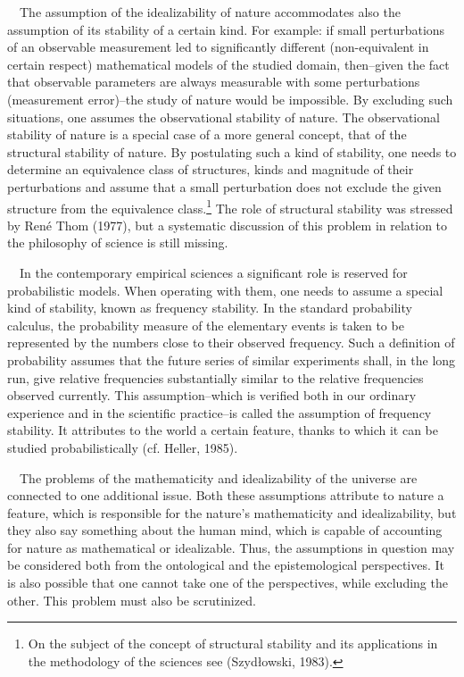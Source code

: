 \documentclass[a4paper]{article}
\begin{document}
\ \ The assumption of  the idealizability of nature accommodates also the assumption of its stability of a certain kind.
For example: if small perturbations of an observable measurement led to significantly different (non-equivalent in
certain respect) mathematical models of the studied domain, then–given the fact that observable parameters are always
measurable with some perturbations (measurement error)–the study of nature would be impossible. By excluding such
situations, one assumes the observational stability of nature. The observational stability of nature is a special case
of a more general concept, that of the structural stability of nature. By postulating such a kind of stability, one
needs to determine an equivalence class of structures, kinds and magnitude of their perturbations and assume that a
small perturbation does not exclude the given structure from the equivalence class.\footnote{On the subject of the
concept of structural stability and its applications in the methodology of the sciences see
\label{ref:RNDPm7wMAH8UM}(Szydłowski, 1983).} The role of structural stability was stressed by René Thom
\label{ref:RNDsgQb0egyxL}(1977), but a systematic discussion of this problem in relation to the philosophy of science
is still missing.

\ \ In the contemporary empirical sciences a significant role is reserved for probabilistic models. When operating with
them, one needs to assume a special kind of stability, known as frequency stability. In the standard probability
calculus, the probability measure of the elementary events is taken to be represented by the numbers close to their
observed frequency. Such a definition of probability assumes that the future series of similar experiments shall, in
the long run, give relative frequencies substantially similar to the relative frequencies observed currently. This 
assumption–which is verified both in our ordinary experience and in the scientific practice–is called the assumption of
frequency stability. It attributes to the world a certain feature, thanks to which it can be studied probabilistically
\label{ref:RNDUm28JJfui2}(cf. Heller, 1985).

\ \ The problems of the mathematicity and idealizability of the universe are connected to one additional issue. Both
these assumptions attribute to nature a feature, which is responsible for the nature’s mathematicity and
idealizability, but they also say something about the human mind, which is capable of accounting for nature as
mathematical or idealizable. Thus, the assumptions in question may be considered both from the ontological and the
epistemological perspectives. It is also possible that one cannot take one of the perspectives, while excluding the
other. This problem must also be scrutinized.
\end{document}
